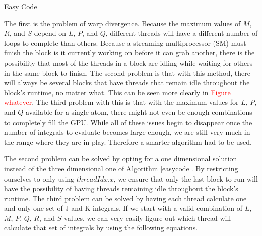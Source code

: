 \documentclass[12pt]{book}
\newcommand{\notetodylan}[1]{\textcolor{red}{#1}} %
\begin{document}
\begin{algorithm}
\caption{Easy Code}
\label{easycode}
\begin{algorithmic}

\STATE{}
				\ELSE
				\ENDIF
					\ELSE
					\ENDIF
					\ENDFOR
				\ENDFOR
			\ENDFOR
\ENDIF
\end{algorithmic}
\end{algorithm}

The first is the problem of warp divergence. Because the maximum values of $M$, $R$, and $S$ depend on $L$, $P$, and $Q$, different threads will have a different number of loops to complete than others. Because a streaming multiprocessor (SM) must finish the block is it currently working on before it can grab another, there is the possibility that most of the threads in a block are idling while waiting for others in the same block to finish. The second problem is that with this method, there will always be several blocks that have threads that remain idle throughout the block's runtime, no matter what. This can be seen more clearly in \notetodylan{Figure whatever}. The third problem with this is that with the maximum values for $L$, $P$, and $Q$ available for a single atom, there might not even be enough combinations to completely fill the GPU. While all of these issues begin to disappear once the number of integrals to evaluate becomes large enough, we are still very much in the range where they are in play. Therefore a smarter algorithm had to be used.

The second problem can be solved by opting for a one dimensional solution instead of the three dimensional one of Algorithm \ref{easycode}. By restricting ourselves to only using $threadIdx.x$, we ensure that only the last block to run will have the possibility of having threads remaining idle throughout the block's runtime. The third problem can be solved by having each thread calculate one and only one set of J and K integrals. If we start with a valid combination of $L$, $M$, $P$, $Q$, $R$, and $S$ values, we can very easily figure out which thread will calculate that set of integrals by using the following equations.
\end{document}
